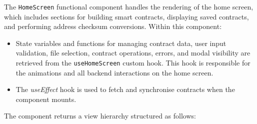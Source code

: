 The \texttt{HomeScreen} functional component handles the rendering of the home screen, which includes sections for building smart contracts, displaying saved contracts, and performing address checksum conversions. Within this component:

\begin{itemize}
    \item State variables and functions for managing contract data, user input validation, file selection, contract operations, errors, and modal visibility are retrieved from the \texttt{useHomeScreen} custom hook. This hook is responsible for the animations and all backend interactions on the home screen.
    \item The \textit{useEffect} hook is used to fetch and synchronise contracts when the component mounts.
\end{itemize}

The component returns a view hierarchy structured as follows:

